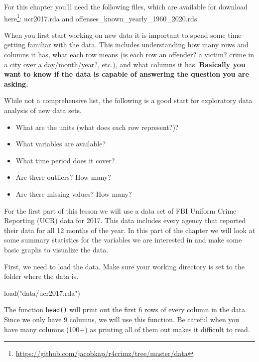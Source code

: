 \documentclass[
  a4paper,
]{krantz}
\makeatletter
\newenvironment{Shaded}{\begin{snugshade}}{\end{snugshade}}
\newcommand{\FunctionTok}[1]{\textcolor[rgb]{0.00,0.00,0.00}{#1}}
\newcommand{\NormalTok}[1]{#1}
\newcommand{\StringTok}[1]{\textcolor[rgb]{0.31,0.60,0.02}{#1}}
\providecommand{\tightlist}{%
  \setlength{\itemsep}{0pt}\setlength{\parskip}{0pt}}
\renewcommand{\href}[2]{#2\footnote{\url{#1}}}
\newenvironment{kframe}{%
\medskip{}
\setlength{\fboxsep}{.8em}
 \def\at@end@of@kframe{}%
 \ifinner\ifhmode%
  \def\at@end@of@kframe{\end{minipage}}%
  \begin{minipage}{\columnwidth}%
 \fi\fi%
 \def\FrameCommand##1{\hskip\@totalleftmargin \hskip-\fboxsep
 \colorbox{shadecolor}{##1}\hskip-\fboxsep
     \hskip-\linewidth \hskip-\@totalleftmargin \hskip\columnwidth}%
 \MakeFramed {\advance\hsize-\width
   \@totalleftmargin\z@ \linewidth\hsize
   \@setminipage}}%
 {\par\unskip\endMakeFramed%
 \at@end@of@kframe}
\renewenvironment{Shaded}{\begin{kframe}}{\end{kframe}}
\makeatother
\begin{document}
For this chapter you'll need the following files, which are
available for download
\href{https://github.com/jacobkap/r4crimz/tree/master/data}{here}:
ucr2017.rda and offenses\_known\_yearly\_1960\_2020.rds.

When you first start working on new data it is important to
spend some time getting familiar with the data. This
includes understanding how many rows and columns it has,
what each row means (is each row an offender? a victim?
crime in a city over a day/month/year?, etc.), and what
columns it has. \textbf{Basically you want to know if the
data is capable of answering the question you are asking.}

While not a comprehensive list, the following is a good
start for exploratory data analysis of new data sets.

\begin{itemize}
\tightlist
\item
  What are the units (what does each row represent?)?
\item
  What variables are available?
\item
  What time period does it cover?
\item
  Are there outliers? How many?
\item
  Are there missing values? How many?
\end{itemize}

For the first part of this lesson we will use a data set of
FBI Uniform Crime Reporting (UCR) data for 2017. This data
includes every agency that reported their data for all 12
months of the year. In this part of the chapter we will look
at some summary statistics for the variables we are
interested in and make some basic graphs to visualize the
data.

First, we need to load the data. Make sure your working
directory is set to the folder where the data is.

\begin{Shaded}
\begin{Highlighting}[]
\FunctionTok{load}\NormalTok{(}\StringTok{"data/ucr2017.rda"}\NormalTok{)}
\end{Highlighting}
\end{Shaded}

The function \texttt{head()} will print out the first 6 rows
of every column in the data. Since we only have 9 columns,
we will use this function. Be careful when you have many
columns (100+) as printing all of them out makes it
difficult to read.
\end{document}
